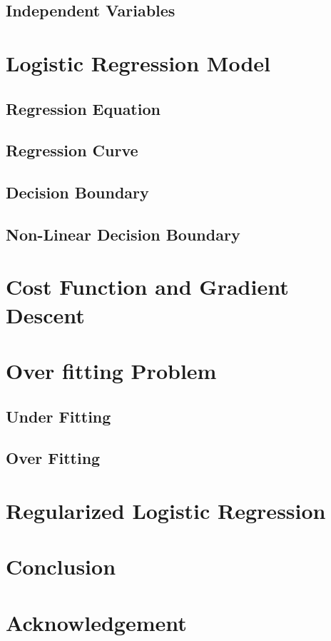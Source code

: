\documentclass[conference]{IEEEtran}
\begin{document}
\subsection{Independent Variables}


\section{Logistic Regression Model}

\subsection{Regression Equation}

\subsection{Regression Curve}
\subsection{Decision Boundary}
\subsection{Non-Linear Decision Boundary}

\section{Cost Function and Gradient Descent}

\section{Over fitting Problem}
\subsection{Under Fitting}
\subsection{Over Fitting}

\section{Regularized Logistic Regression}

\section{Conclusion}

\nocite{b1}

\nocite{b2}


\section*{Acknowledgement}











\end{document}
